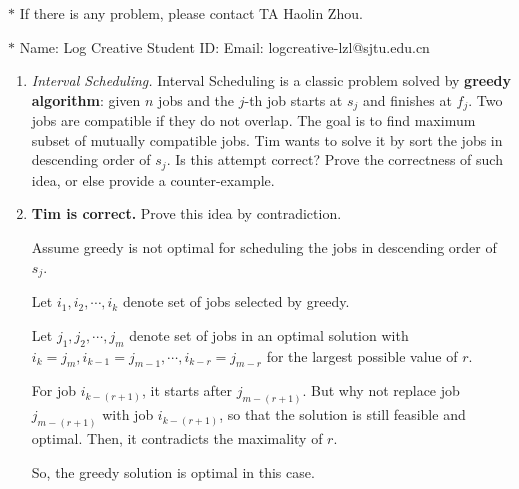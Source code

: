 \documentclass[12pt,a4paper]{article}
\makeatletter
\newtheorem*{solution}{Solution}
\theoremstyle{definition}
\renewenvironment{solution}[1][Solution] {\par\pushQED{\qed}\normalfont\topsep6\p@\@plus6\p@\relax\trivlist\item[\hskip\labelsep\bfseries#1\@addpunct{.}]\ignorespaces}{\popQED\endtrivlist\@endpefalse} \makeatother
\makeatother
\begin{document}
\noindent

\noindent{}


\begin{center}
\footnotesize{\color{red}$*$ If there is any problem, please contact TA Haolin Zhou.}\par
\footnotesize{\color{blue}$*$ Name: Log Creative \quad Student ID:  \quad Email: logcreative-lzl@sjtu.edu.cn}
\end{center}

\begin{enumerate}
	\item \textit{Interval Scheduling.} Interval Scheduling is a classic problem solved by \textbf{greedy algorithm}: given $n$ jobs and the $j$-th job starts at $s_j$ and finishes at $f_j$. Two jobs are compatible if they do not overlap. The goal is to find maximum subset of mutually compatible jobs. Tim wants to solve it by sort the jobs in descending order of $s_j$. Is this attempt correct? Prove the correctness of such idea, or else provide a counter-example.
	\begin{solution}
		\textbf{Tim is correct.} Prove this idea by contradiction.

		Assume greedy is not optimal for scheduling the jobs in descending order of $s_j$.

		Let $i_1,i_2,\cdots,i_k$ denote set of jobs selected by greedy.

		Let $j_1,j_2,\cdots,j_m$ denote set of jobs in an optimal solution with $i_k=j_m,i_{k-1}=j_{m-1},\cdots,i_{k-r}=j_{m-r}$ for the largest possible value of $r$.

		\begin{figure}[h]
			\centering
			
		\end{figure}

		For job $i_{k-(r+1)}$, it starts after $j_{m-(r+1)}$. But why not replace job $j_{m-(r+1)}$ with job $i_{k-(r+1)}$, so that the solution is still feasible and optimal. Then, it contradicts the maximality of $r$.

		So, the greedy solution is optimal in this case.
	\end{solution}
	

\end{enumerate}
\end{document}
